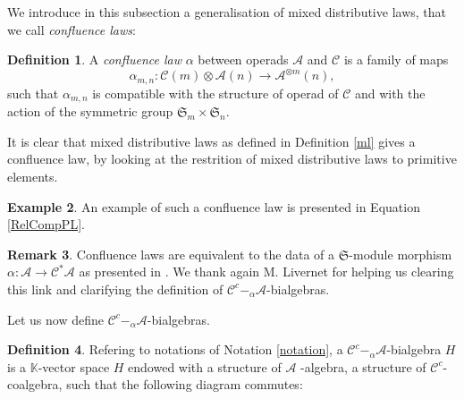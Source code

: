 \documentclass[11pt,leqno]{amsart}
\theoremstyle{definition}
\newtheorem{definition}{Definition}[subsection]
\newtheorem{remark}[definition]{Remark}
\newtheorem{example}[definition]{Example}
\theoremstyle{plain}
\newcommand{\A}{ \mathcal{A} }
\newcommand{\C}{ \mathcal{C} }
\begin{document}
We introduce in this subsection a generalisation of mixed distributive laws, that we call \emph{confluence laws}:


\begin{definition} \label{gml1}
A \emph{confluence law} $\alpha$ between operads $\A$ and $\C$ is a family of maps 
\begin{equation}
\alpha_{m,n} :\mathcal C(m)\otimes \mathcal A(n) \to  \mathcal A^{\otimes m}(n),
\end{equation}
such that $\alpha_{m,n}$ is compatible with the structure of operad of $\C$ and with the action of the symmetric group $\mathfrak{S}_m \times \mathfrak{S}_n$.
\end{definition}

It is clear that mixed distributive laws as defined in Definition \ref{ml} gives a confluence law, by looking at the restrition of mixed distributive laws to primitive elements.

\begin{example}
An example of such a confluence law is presented in Equation \eqref{RelCompPL}.
\end{example}


\begin{remark}
Confluence laws are equivalent to the data of a $\mathfrak{S}$-module morphism $\alpha : \A \rightarrow \C^*\A$ as presented in \cite{Muriel}. We thank again M. Livernet for helping us clearing this link and clarifying the definition of $\C^c-_{\alpha}\A$-bialgebras.
\end{remark}


Let us now define $\C^c-_{\alpha}\A$-bialgebras. 


\begin{definition}\label{defBialg}
Refering to notations of Notation \ref{notation}, a $\C^c-_{\alpha}\A$-bialgebra $H$ is a $\mathbb{K}$-vector space $H$ endowed with a structure of $\A$ -algebra, a structure of $\C^c$-coalgebra, such that the following diagram commutes:

\end{definition}
\end{document}
